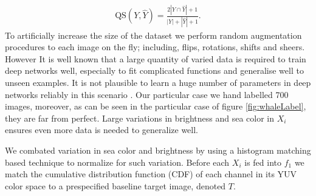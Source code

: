 \documentclass{IET}%
\begin{document}
\begin{align}
\text{QS}(Y,\hat{Y})={\frac {2|Y\cap \hat{Y}| + 1}{|Y|+|\hat{Y}|+1}}.
\end{align}
To artificially increase the size of the dataset we perform random augmentation procedures to each image on the fly; including, flips, rotations, shifts and sheers. However It is well known that a large quantity of varied data is required to train deep networks well, especially to fit complicated functions and generalise well to unseen examples. It is not plausible to learn a huge number of parameters in deep networks reliably in this scenario \cite{zhu2011semi}. Our particular case we hand labelled 700 images, moreover, as can be seen in the particular case of figure \ref{fig:whaleLabel}, they are far from perfect. Large variations in brightness and sea color in $X_i$ ensures even more data is needed to generalize well. 

We combated variation in sea color and brightness by using a histogram matching \cite{gonzalez2002digital} based technique to normalize for such variation. Before each $X_i$ is fed into $f_1$ we match the cumulative distribution function (CDF) of each channel in its YUV color space to a prespecified baseline target image, denoted $T$. 
\end{document}

